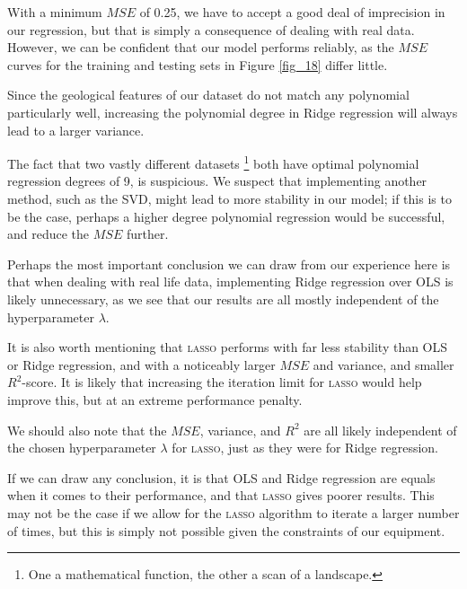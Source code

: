 \documentclass[a4paper,10pt,english]{article}
\begin{document}
With a minimum $MSE$ of 0.25, we have to accept a good deal of imprecision in our regression, but that is simply a consequence of dealing with real data.  However, we can be confident that our model performs reliably, as the $MSE$ curves for the training and testing sets in Figure \ref{fig_18} differ little.

Since the geological features of our dataset do not match any polynomial particularly well, increasing the polynomial degree in Ridge regression will always lead to a larger variance.

The fact that two vastly different datasets \footnote{One a mathematical function, the other a scan of a landscape.} both have optimal polynomial regression degrees of 9, is suspicious.  We suspect that implementing another method, such as the SVD, might lead to more stability in our model; if this is to be the case, perhaps a higher degree polynomial regression would be successful, and reduce the $MSE$ further.

Perhaps the most important conclusion we can draw from our experience here is that when dealing with real life data, implementing Ridge regression over OLS is likely unnecessary, as we see that our results are all mostly independent of the hyperparameter $\lambda$.

It is also worth mentioning that \textsc{lasso} performs with far less stability than OLS or Ridge regression, and with a noticeably larger $MSE$ and variance, and smaller $R^2$-score.  It is likely that increasing the iteration limit for \textsc{lasso} would help improve this, but at an extreme performance penalty.

We should also note that the $MSE$, variance, and $R^2$ are all likely independent of the chosen hyperparameter $\lambda$ for \textsc{lasso}, just as they were for Ridge regression.

If we can draw any conclusion, it is that OLS and Ridge regression are equals when it comes to their performance, and that \textsc{lasso} gives poorer results.  This may not be the case if we allow for the \textsc{lasso} algorithm to iterate a larger number of times, but this is simply not possible given the constraints of our equipment.

{}

\end{document}
